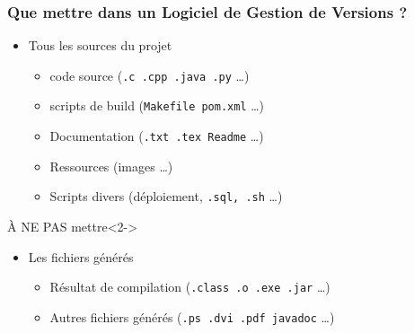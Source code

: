 \documentclass[table,tikz,12pt,svgnames]{beamer}
\begin{document}
\begin{frame}
	\frametitle{Que mettre dans un Logiciel de Gestion de Versions ?}
	\vspace{-2em}
	\begin{block}{}%
    \begin{adjustwidth}{-0.5cm}{}
		\begin{itemize}
			\item Tous les sources du projet
			\begin{itemize}
				\item code source (\texttt{.c .cpp .java .py} \dots)
				\item scripts de build (\texttt{Makefile pom.xml} \ldots)
				\item Documentation (\texttt{.txt .tex Readme} \ldots)
				\item Ressources (images \ldots)
				\item Scripts divers (déploiement, \texttt{.sql, .sh} \ldots)
			\end{itemize}
		\end{itemize}
	\end{adjustwidth}	
	\end{block}
	\begin{block}{\color{red} À NE PAS mettre}<2->
    \begin{adjustwidth}{-0.5cm}{}
	\begin{itemize}
		\item Les fichiers générés
		\begin{itemize}
			\item Résultat de compilation (\texttt{.class .o .exe .jar} \ldots)
			\item Autres fichiers générés (\texttt{.ps .dvi .pdf javadoc} \ldots)
		\end{itemize}
	\end{itemize}
	\end{adjustwidth}
	\end{block}
\end{frame}


\end{document}
